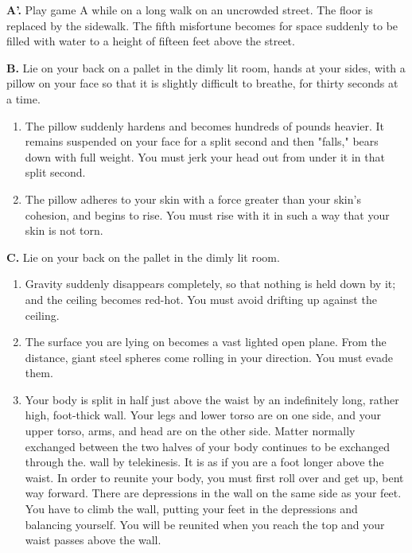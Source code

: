 \textbf{A'.} Play game A while on a long walk on an uncrowded street. The floor 
is replaced by the sidewalk. The fifth misfortune becomes for space suddenly 
to be filled with water to a height of fifteen feet above the street. 

\textbf{B.} Lie on your back on a pallet in the dimly lit room, hands at your 
sides, with a pillow on your face so that it is slightly difficult to breathe, for 
thirty seconds at a time. 
\begin{enumerate}
\item The pillow suddenly hardens and becomes hundreds of pounds heavier. It 
remains suspended on your face for a split second and then "falls," bears 
down with full weight. You must jerk your head out from under it in that 
split second. 

\item The pillow adheres to your skin with a force greater than your skin's 
cohesion, and begins to rise. You must rise with it in such a way that your 
skin is not torn. 
\end{enumerate}

\textbf{C.} Lie on your back on the pallet in the dimly lit room. 

\begin{enumerate}
\item Gravity suddenly disappears completely, so that nothing is held down by 
it; and the ceiling becomes red-hot. You must avoid drifting up against the 
ceiling. 

\item The surface you are lying on becomes a vast lighted open plane. From the 
distance, giant steel spheres come rolling in your direction. You must evade 
them. 

\item Your body is split in half just above the waist by an indefinitely long, 
rather high, foot-thick wall. Your legs and lower torso are on one side, and 
your upper torso, arms, and head are on the other side. Matter normally 
exchanged between the two halves of your body continues to be exchanged 
through the. wall by telekinesis. It is as if you are a foot longer above the 
waist. In order to reunite your body, you must first roll over and get up, 
bent way forward. There are depressions in the wall on the same side as your 
feet. You have to climb the wall, putting your feet in the depressions and 
balancing yourself. You will be reunited when you reach the top and your 
waist passes above the wall. 
\end{enumerate}

